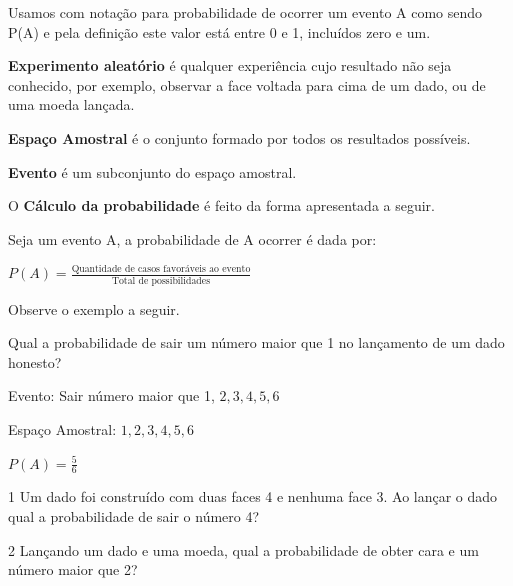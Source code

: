 {{{\begin{escolha}
{{{{\begin{escolha}
\begin{escolha}
{{\begin{enumerate}
{{{Usamos com notação para probabilidade de ocorrer um evento A como sendo
P(A) e pela definição este valor está entre 0 e 1, incluídos zero e um.

\textbf{Experimento aleatório} é qualquer experiência cujo resultado não
seja conhecido, por exemplo, observar a face voltada para cima de um
dado, ou de uma moeda lançada. 

\textbf{Espaço Amostral} é o conjunto formado por todos os resultados possíveis.

\textbf{Evento} é um subconjunto do espaço amostral.

O \textbf{Cálculo da probabilidade} é feito da forma apresentada a seguir.

Seja um evento A, a probabilidade de A ocorrer é dada por:

$P(A)=\frac{\text{Quantidade de casos favoráveis ao evento}}{\text{Total de possibilidades}}$

Observe o exemplo a seguir.

Qual a probabilidade de sair um número maior que 1 no lançamento de um dado honesto?

Evento: Sair número maior que 1, ${2, 3, 4, 5, 6}$

Espaço Amostral: ${1, 2, 3, 4, 5, 6}$

$P(A) = \frac{5}{6}$
}


\num{1} Um dado foi construído com duas faces 4 e nenhuma face 3. Ao lançar o
dado qual a probabilidade de sair o número 4?


\num{2} Lançando um dado e uma moeda, qual a probabilidade de obter cara e um
número maior que 2?


}}
\end{enumerate}}}
\end{escolha}
\end{escolha}}}}}
\end{escolha}}}}
